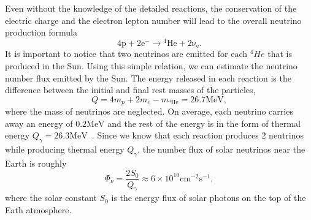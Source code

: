 Even without the knowledge of the detailed reactions, the conservation of the electric charge and the electron lepton number will lead to the overall neutrino production formula
\begin{equation}
\mathrm{4p+2e^- \to {}^4He + 2\nu_e }.
\end{equation}
It is important to notice that two neutrinos are emitted for each ${}^4He$ that is produced in the Sun. Using this simple relation, we can estimate the neutrino number flux emitted by the Sun. The energy released in each reaction is the difference between the initial and final rest masses of the particles,
\begin{equation}
Q=4m_p+2m_e-m_{{}^4 \mathrm{He}}=26.7\mathrm{MeV},
\end{equation}
where the mass of neutrinos are neglected. On average, each neutrino carries away an energy of $0.2\mathrm{MeV}$ and the rest of the energy is in the form of thermal energy $Q_\gamma=26.3\mathrm{MeV}$~\cite{Adelberger2011a}. %
Since we know that each reaction produces 2 neutrinos while producing thermal energy $Q_\gamma$, the number flux of solar neutrinos near the Earth is roughly
\begin{equation}
\Phi_\nu = \frac{2 S_0}{Q_\gamma} \approx 6\times 10^{10} \mathrm{cm^{-2}s^{-1}},
\end{equation}
where the solar constant $S_0$ is the energy flux of solar photons on the top of the Eath atmosphere.



